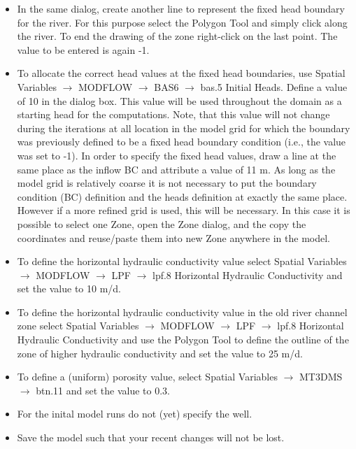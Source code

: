 \begin{itemize}
\item In the same dialog, create another line to represent the fixed head boundary for the river. 
For this purpose select the {\color{blue}Polygon Tool} 
and simply click along the river. 
To end the drawing of the zone right-click on the last point. 
The value to be entered is again -1.

\item To allocate the correct head values at the fixed head boundaries, 
use {\color{blue}Spatial Variables} $\rightarrow$ {\color{blue}MODFLOW} $\rightarrow$ 
{\color{blue}BAS6}
$\rightarrow$ {\color{blue}bas.5 Initial Heads}. 
Define a value of 10 in the dialog box.
This value will be used throughout the domain as a starting head for the computations.
Note, that this value will not change during the iterations at all location in the model grid for which 
the boundary was previously defined to be a fixed head boundary condition (i.e., the value was set to -1).
In order to specify the fixed head values, draw a line at the same place as the inflow BC 
and attribute a value of 11 m. As long as the model grid is relatively 
coarse it is not necessary to put the boundary condition (BC) definition
and the heads definition at exactly the same place. 
However if a more refined grid is used, this will be necessary. 
In this case it is possible to select one {\color{blue}Zone}, open the {\color{blue}Zone} dialog, 
and the copy the coordinates and reuse/paste them into new {\color{blue}Zone} 
anywhere in the model.

\item To define the horizontal hydraulic conductivity value 
select {\color{blue}Spatial Variables} 
$\rightarrow$ {\color{blue}MODFLOW} $\rightarrow$ {\color{blue}LPF} $\rightarrow$ 
{\color{blue}lpf.8 Horizontal Hydraulic Conductivity} and set the value to 10 m/d.

\item To define the horizontal hydraulic conductivity value in the old river channel zone
select {\color{blue}Spatial Variables} $\rightarrow$ {\color{blue}MODFLOW} $\rightarrow$ 
{\color{blue}LPF} $\rightarrow$ {\color{blue}lpf.8 Horizontal Hydraulic Conductivity} 
and use the {\color{blue}Polygon Tool} to define the outline of the zone of higher 
hydraulic conductivity and set the value to 25 m/d.
 

\item To define a (uniform) porosity value, select {\color{blue}Spatial Variables} 
$\rightarrow$ {\color{blue}MT3DMS} $\rightarrow$ {\color{blue}btn.11} 
and set the value to 0.3. 

\item For the inital model runs do not (yet) specify the well.

\item Save the model such that your recent changes will not be lost.

\end{itemize}



